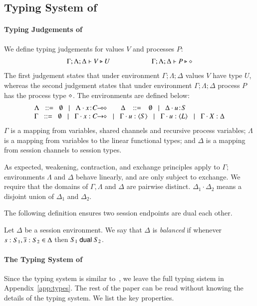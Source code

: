 \subsection{Typing System of \HOp}
\label{subsec:typing}
\paragraph{Typing Judgements of \HOp}
\noi We define typing judgements for values $V$
and processes $P$:
%
\[	\begin{array}{c}
		\Gamma; \Lambda; \Delta \vdash V \triangleright U \qquad \qquad \qquad \Gamma; \Lambda; \Delta \vdash P \triangleright \diamond
	\end{array}
\]
The first judgement
states that under environment $\Gamma; \Lambda; \Delta$ values $V$
have type $U$, whereas the second judgement states that under
environment $\Gamma; \Lambda; \Delta$ process $P$ has the process type
$\diamond$. The environments are defined below:
\[
\begin{array}{l}
 \Lambda \bnfis  \emptyset \bnfbar \Lambda \cat \AT{x}{\lhot{C}}
\quad\quad \Delta  \ \bnfis  \ \emptyset \bnfbar \Delta \cat \AT{u}{S} \\
 \Gamma  \bnfis  \emptyset \bnfbar \Gamma \cat \varp{x}: \shot{C} \bnfbar \Gamma \cat u: \chtype{S} \bnfbar \Gamma \cat u: \chtype{L} 
        \bnfbar \Gamma \cat \rvar{X}: \Delta
\end{array}
\]
\noi 
$\Gamma$ is a mapping from variables, shared channels and recursive 
process variables;  $\Lambda$ is a mapping from variables to 
the linear functional types; and $\Delta$ is a mapping from 
session channels to session types. 

As expected, weakening, contraction, and exchange principles apply to
$\Gamma$; environments $\Lambda$ and $\Delta$ behave linearly, and are
only subject to exchange.  We require that the domains of $\Gamma,
\Lambda$ and $\Delta$ are pairwise distinct. $\Delta_1\cdot \Delta_2$ means 
a disjoint union of $\Delta_1$ and $\Delta_2$.  

The following definition ensures two session endpoints 
are dual each other. 

\begin{definition}[Balance]\label{d:wtenv}%
	Let $\Delta$ be a session environment.
	We say that $\Delta$ is {\em balanced} if whenever
	$s: S_1, \overline{s}: S_2 \in \Delta$ then $S_1 \ \mathsf{dual}\  S_2$.
\end{definition}

\paragraph{The Typing System of \HOp}
Since the typing system is similar to~\cite{tlca07,mostrous_phd}, we leave the full
typing sistem in Appendix~\ref{app:types}.  The rest of the paper can
be read without knowing the details of the typing system. We list the
key properties.

